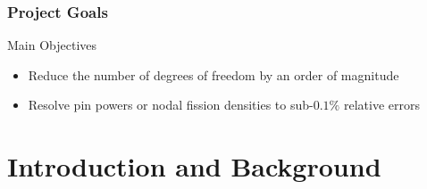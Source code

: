 \documentclass[fleqn]{beamer}
\begin{document}
  \begin{frame}
      \frametitle{Project Goals}
      \begin{block}{Main Objectives}
          \begin{itemize}
              \item Reduce the number of degrees of freedom by an order of 
              magnitude
              \item Resolve pin powers or nodal fission densities to 
              sub-$0.1\%$ relative errors
          \end{itemize}
      \end{block}
  \end{frame}



  
  \section{Introduction and Background}
  
\end{document}
